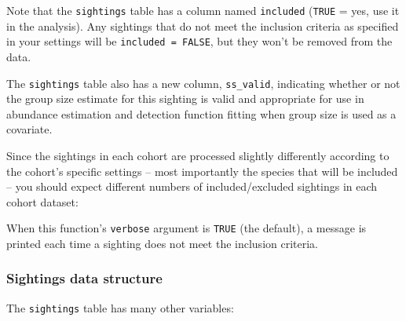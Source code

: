 \documentclass[
]{book}
\newenvironment{Shaded}{\begin{snugshade}}{\end{snugshade}}
\newcommand{\ConstantTok}[1]{\textcolor[rgb]{0.56,0.35,0.01}{#1}}
\newcommand{\DecValTok}[1]{\textcolor[rgb]{0.00,0.00,0.81}{#1}}
\newcommand{\NormalTok}[1]{#1}
\newcommand{\SpecialCharTok}[1]{\textcolor[rgb]{0.81,0.36,0.00}{\textbf{#1}}}
\begin{document}
Note that the \texttt{sightings} table has a column named \texttt{included} (\texttt{TRUE} = yes, use it in the analysis). Any sightings that do not meet the inclusion criteria as specified in your settings will be \texttt{included\ =\ FALSE}, but they won't be removed from the data.

The \texttt{sightings} table also has a new column, \texttt{ss\_valid},
indicating whether or not the group size estimate for this sighting
is valid and appropriate for use in abundance estimation and detection function fitting
when group size is used as a covariate.

Since the sightings in each cohort are processed slightly differently according to the cohort's specific settings -- most importantly the species that will be included -- you should expect different numbers of included/excluded sightings in each cohort dataset:

\begin{Shaded}
\end{Shaded}

When this function's \texttt{verbose} argument is \texttt{TRUE} (the default), a message is printed each time a sighting does not meet the inclusion criteria.

\hypertarget{sightings-data-structure}{%
\subsubsection*{Sightings data structure}\label{sightings-data-structure}}

The \texttt{sightings} table has many other variables:
\end{document}
